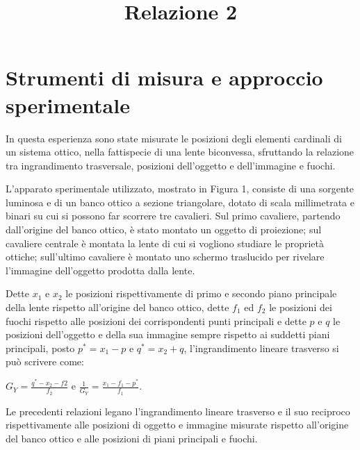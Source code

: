 \documentclass{article}
\title{Relazione 2}
\begin{document}
	
	\maketitle
	
	
	
	\section{Strumenti di misura e approccio sperimentale}
	
	In questa esperienza sono state misurate le posizioni degli elementi cardinali di un sistema ottico, nella fattispecie di una lente biconvessa, sfruttando la relazione tra ingrandimento trasversale, posizioni dell'oggetto e dell'immagine e fuochi.
	
	L'apparato sperimentale utilizzato, mostrato in Figura 1, consiste di una sorgente luminosa e di un banco ottico a sezione triangolare, dotato di scala millimetrata e binari su cui si possono far scorrere tre cavalieri. Sul primo cavaliere, partendo dall'origine del banco ottico, è stato montato un oggetto di proiezione; sul cavaliere centrale è montata la lente di cui si vogliono studiare le proprietà ottiche; sull'ultimo cavaliere è montato uno schermo traslucido per rivelare l'immagine dell'oggetto prodotta dalla lente.
	
	Dette $x_1$ e $x_2$ le posizioni rispettivamente di primo e secondo piano principale della lente rispetto all'origine del banco ottico, dette $f_1$ ed $f_2$ le posizioni dei fuochi rispetto alle posizioni dei corrispondenti punti principali e dette $p$ e $q$ le posizioni dell'oggetto e della sua immagine sempre rispetto ai suddetti piani principali, posto $p^*=x_1-p$ e $q^*=x_2+q$,
	l'ingrandimento lineare trasverso si può scrivere come: 

	$G_Y=\frac{q^*-x_2-f2}{f_2}$
	e
	$\frac{1}{G_Y}=\frac{x_1-f_1-p^*}{f_1}$.
	
	Le precedenti relazioni legano l'ingrandimento lineare trasverso e il suo reciproco rispettivamente alle posizioni di oggetto e immagine misurate rispetto all'origine del banco ottico e alle posizioni di piani principali e fuochi.
	
\end{document}
